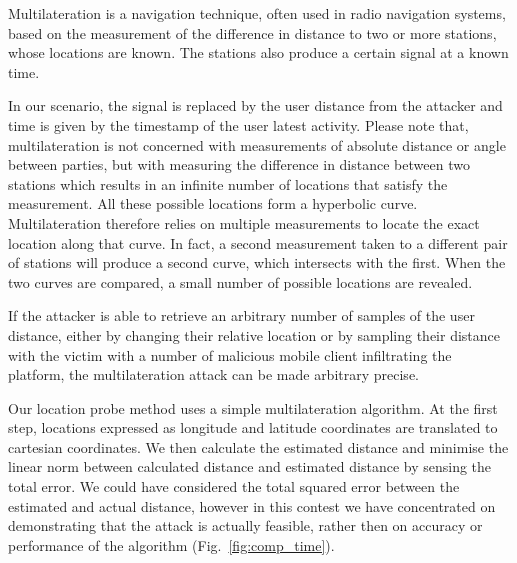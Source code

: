 Multilateration is a navigation technique, often used in radio navigation systems, based on the measurement of the difference in distance to two or more stations, whose locations are known. The stations also produce a certain signal at a known time.\

In our scenario, the signal is replaced by the user distance from the attacker and time is given by the timestamp of the user latest activity. Please note that, multilateration is not concerned with measurements of absolute distance or angle between parties, but with measuring the difference in distance between two stations which results in an infinite number of locations that satisfy the measurement. All these possible locations form a hyperbolic curve. Multilateration therefore relies on multiple measurements to locate the exact location along that curve. In fact, a second measurement taken to a different pair of stations will produce a second curve, which intersects with the first. When the two curves are compared, a small number of possible locations are revealed.

If the attacker is able to retrieve an arbitrary number of samples of the user distance, either by changing their relative location or by sampling their distance with the victim with a number of malicious mobile client infiltrating the platform, the multilateration attack can be made arbitrary precise.

Our location probe method uses a simple multilateration algorithm. At the first step, locations expressed as longitude and latitude coordinates are translated to cartesian coordinates. We then calculate the estimated distance and minimise the linear norm between calculated distance and estimated distance by sensing the total error. We could have considered the total squared error between the estimated and actual distance, however in this contest we have concentrated on demonstrating that the attack is actually feasible, rather then on accuracy or performance of the algorithm (Fig.~\ref{fig:comp_time}).

